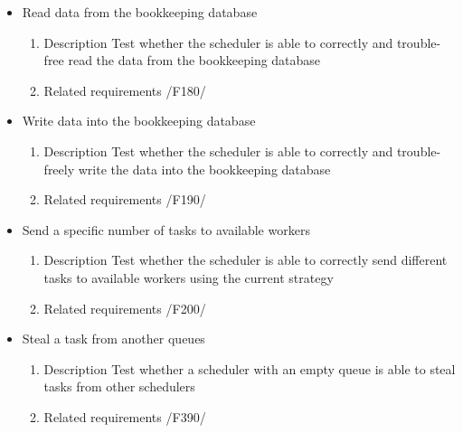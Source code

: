 {\begin{itemize}
				
				\item Read data from the bookkeeping database
				\begin{enumerate}
					\item Description\newline
Test whether the scheduler is able to correctly and trouble-free read the data from the bookkeeping database
					\item Related requirements\newline
						/F180/
				\end{enumerate}
				
				
				\item Write data into the bookkeeping database
				\begin{enumerate}
					\item Description\newline
Test whether the scheduler is able to correctly and trouble-freely write the data into the bookkeeping database
					\item Related requirements\newline
						/F190/
				\end{enumerate}
				
				
				\item Send a specific number of tasks to available workers
				\begin{enumerate}
					\item Description\newline
Test whether the scheduler is able to correctly send different tasks to available workers using the current strategy
					\item Related requirements\newline
						/F200/
				\end{enumerate}
								
			
			
			
				\item Steal a task from another queues
				\begin{enumerate}
					\item Description\newline
Test whether a scheduler with an empty queue is able to steal tasks from other schedulers
					\item Related requirements\newline
						/F390/
				\end{enumerate}
							
			
			

\end{itemize}}
